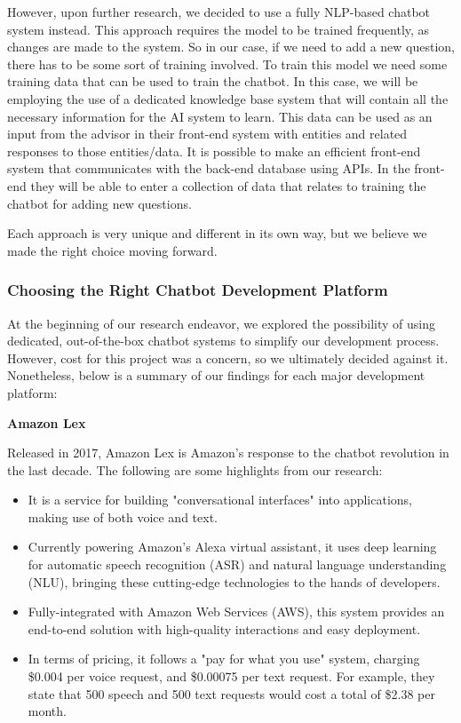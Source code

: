 \documentclass[titlepage, 12pt]{article}
\begin{document}
However, upon further research, we decided to use a fully NLP-based chatbot system instead. This approach requires the model to be trained frequently, as changes are made to the system. So in our case, if we need to add a new question, there has to be some sort of training involved. To train this model we need some training data that can be used to train the chatbot. In this case, we will be employing the use of a dedicated knowledge base system that will contain all the necessary information for the AI system to learn. This data can be used as an input from the advisor in their front-end system with entities and related responses to those entities/data. It is possible to make an efficient front-end system that communicates with the back-end database using APIs. In the front-end they will be able to enter a collection of data that relates to training the chatbot for adding new questions.

Each approach is very unique and different in its own way, but we believe we made the right choice moving forward.


\subsubsection{Choosing the Right Chatbot Development Platform}

At the beginning of our research endeavor, we explored the possibility of using dedicated, out-of-the-box chatbot systems to simplify our development process. However, cost for this project was a concern, so we ultimately decided against it. Nonetheless, below is a summary of our findings for each major development platform:

\textbf{Amazon Lex}

Released in 2017, Amazon Lex is Amazon's response to the chatbot revolution in the last decade. The following are some highlights from our research:

\begin{itemize}
    \item It is a service for building "conversational interfaces" into applications, making use of both voice and text.
    \item Currently powering Amazon's Alexa virtual assistant, it uses deep learning for automatic speech recognition (ASR) and natural language understanding (NLU), bringing these cutting-edge technologies to the hands of developers.
    \item Fully-integrated with Amazon Web Services (AWS), this system provides an end-to-end solution with high-quality interactions and easy deployment.
    \item In terms of pricing, it follows a "pay for what you use" system, charging \$0.004 per voice request, and \$0.00075 per text request. For example, they state that 500 speech and 500 text requests would cost a total of \$2.38 per month.
\end{itemize}
\end{document}
